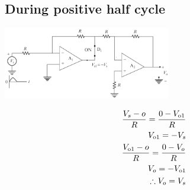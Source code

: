 \documentclass[a4paper, 12pt]{report}
\begin{document}
\begin{center}
\begin{center}
\begin{center}
\begin{center}
\begin{center}
\begin{center}
\begin{center}
\begin{center}
\begin{center}
\begin{center}
\begin{center}
\begin{center}
\begin{multicols}{2}
    \subsection*{During positive half cycle}
    \begin{center}
        \includegraphics[width=0.55\textwidth]{figures/212c2.png}\\
    \end{center}
    \begin{equation}\notag
        \begin{align}
            \frac{V_s-o}{R} = \frac{0-V_\text{o1}}{R}\\
            V_\text{o1} = -V_s\\
            \frac{V_\text{o1}-o}{R} = \frac{0-V_o}{R}\\
            V_o = -V_\text{o1}\\
            \therefore V_o = V_s\\
            \\
            \\
            \\
            \\
        \end{align}
    \end{equation}


\end{multicols}
\end{center}
\end{center}
\end{center}
\end{center}
\end{center}
\end{center}
\end{center}
\end{center}
\end{center}
\end{center}
\end{center}
\end{center}
\end{document}
